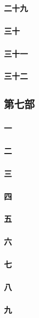 \subsubsection*{二十九}
\subsubsection*{三十}
\subsubsection*{三十一}
\subsubsection*{三十二}






\subsection*{第七部}



\subsubsection*{一}
\subsubsection*{二}
\subsubsection*{三}
\subsubsection*{四}
\subsubsection*{五}
\subsubsection*{六}
\subsubsection*{七}
\subsubsection*{八}
\subsubsection*{九}

